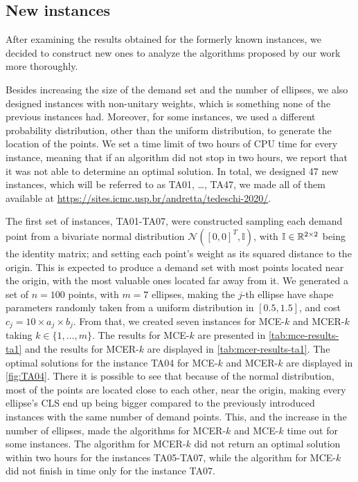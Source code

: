 \subsection{New instances}

After examining the results obtained for the formerly known instances, we decided to construct new ones to analyze the algorithms proposed by our work more thoroughly.

Besides increasing the size of the demand set and the number of ellipses, we also designed instances with non-unitary weights, which is something none of the previous instances had. 
Moreover, for some instances, we used a different probability distribution, other than the uniform distribution, to generate the location of the points.
We set a time limit of two hours of CPU time for every instance, meaning that if an algorithm did not stop in two hours, we report that it was not able to determine an optimal solution. 
In total, we designed 47 new instances, which will be referred to as TA01, \dots, TA47, we made all of them available at \url{https://sites.icmc.usp.br/andretta/tedeschi-2020/}.

The first set of instances, TA01-TA07, were constructed sampling each demand point from a bivariate normal distribution $\mathcal{N}([0, 0]^T, \mathbb{I})$, with $\mathbb{I} \in \mathbb{R}^{2\times 2}$ being the identity matrix; and setting each point's weight as its squared distance to the origin. This is expected to produce a demand set with most points located near the origin, with the most valuable ones located far away from it.
We generated a set of $n=100$ points, with $m=7$ ellipses, making the $j$-th ellipse have shape parameters randomly taken from a uniform distribution in $[0.5, 1.5]$, and cost $c_j=10\times a_j \times b_j$. From that, we created seven instances for MCE-$k$ and MCER-$k$ taking $k \in \{1, \dots, m\}$. The results for MCE-$k$ are presented in \autoref{tab:mce-results-ta1} and the results for MCER-$k$ are displayed in \autoref{tab:mcer-results-ta1}.
The optimal solutions for the instance TA04 for MCE-$k$ and MCER-$k$ are displayed in \autoref{fig:TA04}. There it is possible to see that because of the normal distribution, most of the points are located close to each other, near the origin, making every ellipse's CLS end up being bigger compared to the previously introduced instances with the same number of demand points. 
This, and the increase in the number of ellipses, made the algorithms for MCER-$k$ and MCE-$k$ time out for some instances. The algorithm for MCER-$k$ did not return an optimal solution within two hours for the instances TA05-TA07, while the algorithm for MCE-$k$ did not finish in time only for the instance TA07. 


